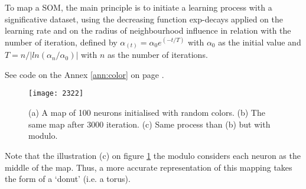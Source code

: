 To map a SOM, the main principle is to initiate a learning process with a significative dataset, using the decreasing function \glspl{exp-decay} applied on the learning rate and on the radius of neighbourhood influence in relation with the number of iteration, defined by $\alpha_{(t)} = \alpha_0 e^{(-t/T)}$ with $\alpha_0$ as the initial value and $T=n/|ln(\alpha_n/\alpha_0)|$ with $n$ as the number of iterations. 

\bigskip

See code on the Annex \ref{ann:color} on page \pageref{ann:color}.

\begin{figure}[htbp]
\begin{center}
\texttt{[image: 2322]}
\caption{(a) A map of 100 neurons initialised with random colors. (b) The same map after 3000 iteration. (c) Same process than (b) but with modulo.}
\label{fig:ex1}
\end{center}
\end{figure}

Note that the illustration (c) on figure \ref{fig:ex1} the modulo considers each neuron as the middle of the map. Thus, a more accurate representation of this mapping takes the form of a `donut' (i.e. a torus).